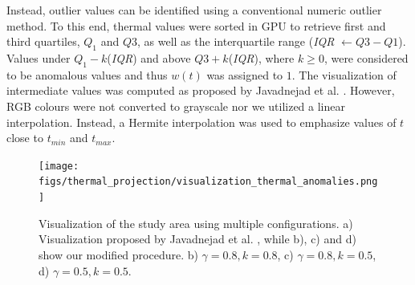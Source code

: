Instead, outlier values can be identified using a conventional numeric outlier method. To this end, thermal values were sorted in GPU to retrieve first and third quartiles, $Q_1$ and $Q3$, as well as the interquartile range (\textit{IQR} $\gets Q3 - Q1$). Values under $Q_1 - k$(\textit{IQR}) and above $Q3 + k$(\textit{IQR}), where $k \geq 0$, were considered to be anomalous values and thus $w(t)$ was assigned to $1$. The visualization of intermediate values was computed as proposed by Javadnejad et al. \cite{javadnejad_photogrammetric_2020}. However, RGB colours were not converted to grayscale nor we utilized a linear interpolation. Instead, a Hermite interpolation was used to emphasize values of $t$ close to $t_{\textit{min}}$ and $t_{\textit{max}}$. 

\begin{figure}[ht]
	\centering
	\texttt{[image: figs/thermal\_projection/visualization\_thermal\_anomalies.png]}
	\caption{Visualization of the study area using multiple configurations. a) Visualization proposed by Javadnejad et al. \cite{javadnejad_photogrammetric_2020}, while b), c) and d) show our modified procedure. b) $\gamma = 0.8, k = 0.8$, c) $\gamma = 0.8, k = 0.5$, d) $\gamma = 0.5, k = 0.5$.}
	\label{fig:visualization_thermal_anomalies}
\end{figure}

